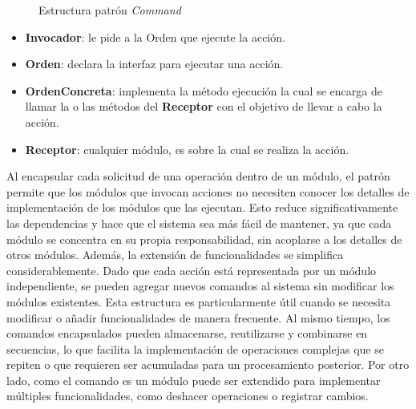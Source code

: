 \begin{figure}[H]
\caption{Estructura patrón \textit{Command}}
\begin{center}
\end{center}
\end{figure}

\begin{itemize}
    \item \textbf{Invocador}: le pide a la Orden que ejecute la acción.
    \item \textbf{Orden}: declara la interfaz para ejecutar una acción.
    \item \textbf{OrdenConcreta}: implementa la método ejecución la cual se encarga de llamar la o las métodos del \textbf{Receptor} con el objetivo de llevar a cabo la acción.
    \item \textbf{Receptor}: cualquier módulo, es sobre la cual se realiza la acción.
\end{itemize}

Al encapsular cada solicitud de una operación dentro de un módulo, el patrón permite que los módulos que invocan acciones no necesiten conocer los detalles de implementación de los módulos que las ejecutan. Esto reduce significativamente las dependencias y hace que el sistema sea más fácil de mantener, ya que cada módulo se concentra en su propia responsabilidad, sin acoplarse a los detalles de otros módulos. Además, la extensión de funcionalidades se simplifica considerablemente. Dado que cada acción está representada por un módulo independiente, se pueden agregar nuevos comandos al sistema sin modificar los módulos existentes. Esta estructura es particularmente útil cuando se necesita modificar o añadir funcionalidades de manera frecuente. Al mismo tiempo, los comandos encapsulados pueden almacenarse, reutilizarse y combinarse en secuencias, lo que facilita la implementación de operaciones complejas que se repiten o que requieren ser acumuladas para un procesamiento posterior. Por otro lado, como el comando es un módulo puede ser extendido para implementar múltiples funcionalidades, como deshacer operaciones o registrar cambios. 

